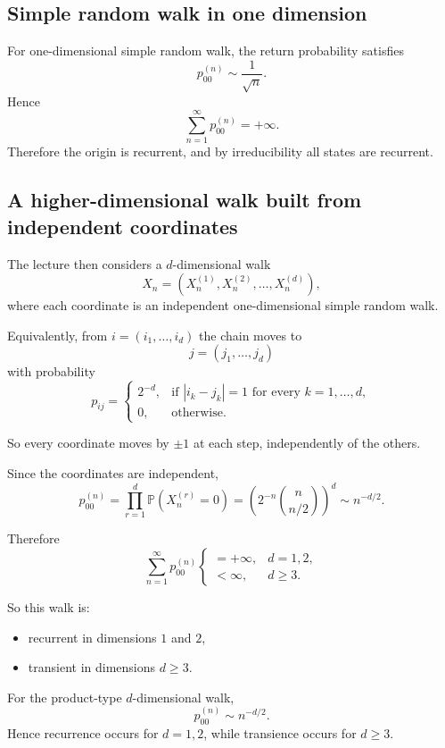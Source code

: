 \documentclass[11pt]{article}
\theoremstyle{definition}
\begin{document}
\subsection{Simple random walk in one dimension}

For one-dimensional simple random walk, the return probability satisfies
\[
p_{00}^{(n)}\sim \frac{1}{\sqrt n}.
\]
Hence
\[
\sum_{n=1}^\infty p_{00}^{(n)}=+\infty.
\]
Therefore the origin is recurrent, and by irreducibility all states are recurrent.

\subsection{A higher-dimensional walk built from independent coordinates}

The lecture then considers a \(d\)-dimensional walk
\[
X_n=(X_n^{(1)},X_n^{(2)},\dots,X_n^{(d)}),
\]
where each coordinate is an independent one-dimensional simple random walk.

Equivalently, from \(i=(i_1,\dots,i_d)\) the chain moves to
\[
j=(j_1,\dots,j_d)
\]
with probability
\[
p_{ij}
=
\begin{cases}
2^{-d}, & \text{if } |i_k-j_k|=1 \text{ for every } k=1,\dots,d,\\[0.4em]
0, & \text{otherwise.}
\end{cases}
\]

So every coordinate moves by \(\pm 1\) at each step, independently of the others.

Since the coordinates are independent,
\[
p_{00}^{(n)}
=
\prod_{r=1}^d \mathbb P(X_n^{(r)}=0)
=
\left(2^{-n}\binom{n}{n/2}\right)^d
\sim n^{-d/2}.
\]

Therefore
\[
\sum_{n=1}^\infty p_{00}^{(n)}
\begin{cases}
=+\infty, & d=1,2,\\[0.3em]
<\infty, & d\ge 3.
\end{cases}
\]

So this walk is:
\begin{itemize}[leftmargin=2em]
    \item recurrent in dimensions \(1\) and \(2\),
    \item transient in dimensions \(d\ge 3\).
\end{itemize}

\begin{keyformula}
For the product-type \(d\)-dimensional walk,
\[
p_{00}^{(n)}\sim n^{-d/2}.
\]
Hence recurrence occurs for \(d=1,2\), while transience occurs for \(d\ge 3\).
\end{keyformula}
\end{document}
